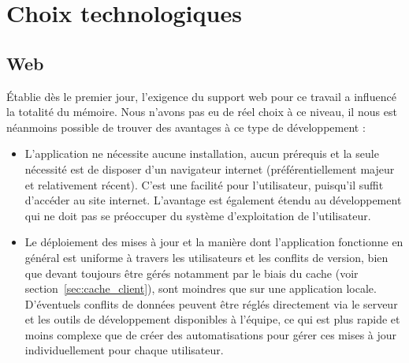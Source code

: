 \documentclass{EPL-master-thesis-covers-FR}
\begin{document}


		\section{Choix technologiques}
			\label{sec:choix_tech}




			\subsection*{Web}

				\'Etablie dès le premier jour, l'exigence du support web pour ce travail a influencé la totalité du mémoire. Nous n'avons pas eu de réel choix à ce niveau, il nous est néanmoins possible de trouver des avantages à ce type de développement :
				\begin{itemize}
					\item L'application ne nécessite aucune installation, aucun prérequis et la seule nécessité est de disposer d'un navigateur internet (préférentiellement majeur et relativement récent). C'est une facilité pour l'utilisateur, puisqu'il suffit d'accéder au site internet. L'avantage est également étendu au développement qui ne doit pas se préoccuper du système d'exploitation de l'utilisateur.
					\item Le déploiement des mises à jour et la manière dont l'application fonctionne en général est uniforme à travers les utilisateurs et les conflits de version, bien que devant toujours être gérés notamment par le biais du cache (voir section~\ref{sec:cache_client}), sont moindres que sur une application locale. D'éventuels conflits de données peuvent être réglés directement via le serveur et les outils de développement disponibles à l'équipe, ce qui est plus rapide et moins complexe que de créer des automatisations pour gérer ces mises à jour individuellement pour chaque utilisateur.
				\end{itemize}
\end{document}
